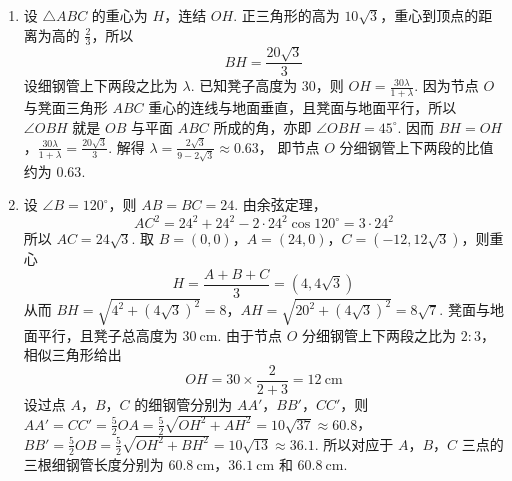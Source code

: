 \begin{solution}
\begin{enumerate}
\item 设 \(\triangle ABC\) 的重心为 \(H\)，连结 \(OH\). 正三角形的高为 \(10\sqrt3\)，重心到顶点的距离为高的 \(\frac23\)，所以
\[
BH=\frac{20\sqrt3}{3}
\]
设细钢管上下两段之比为 \(\lambda\). 已知凳子高度为 \(30\)，则
\(OH=\frac{30\lambda}{1+\lambda}\).
因为节点 \(O\) 与凳面三角形 \(ABC\) 重心的连线与地面垂直，且凳面与地面平行，所以 \(\angle OBH\) 就是 \(OB\) 与平面 \(ABC\) 所成的角，亦即 \(\angle OBH=45^\circ\). 因而
\(BH=OH\)，\(\frac{30\lambda}{1+\lambda}=\frac{20\sqrt{3}}{3}\).
解得
\(\lambda=\frac{2\sqrt{3}}{9-2\sqrt{3}}\approx 0.63\)，
即节点 \(O\) 分细钢管上下两段的比值约为 \(0.63\).
\end{enumerate}


\begin{enumerate}
\setcounter{enumi}{1}
\item 设 \(\angle B=120^\circ\)，则 \(AB=BC=24\). 由余弦定理，
\[
AC^2=24^2+24^2-2\cdot24^2\cos120^\circ=3\cdot24^2
\]
所以 \(AC=24\sqrt3\). 取 \(B=(0,0)\)，\(A=(24,0)\)，\(C=(-12,12\sqrt3)\)，则重心
\[
H=\frac{A+B+C}{3}=(4,4\sqrt3)
\]
从而
\(BH=\sqrt{4^2+(4\sqrt3)^2}=8\)，\(AH=\sqrt{20^2+(4\sqrt3)^2}=8\sqrt7\).
凳面与地面平行，且凳子总高度为 \(30\mathrm{~cm}\). 由于节点 \(O\) 分细钢管上下两段之比为 \(2:3\)，相似三角形给出
\[
OH=30\times\frac{2}{2+3}=12\mathrm{~cm}
\]
设过点 \(A\)，\(B\)，\(C\) 的细钢管分别为 \(AA'\)，\(BB'\)，\(CC'\)，则
\(AA'=CC'=\frac{5}{2}OA=\frac{5}{2}\sqrt{OH^2+AH^2}=10\sqrt{37}\approx 60.8\)，\(BB'=\frac{5}{2}OB=\frac{5}{2}\sqrt{OH^2+BH^2}=10\sqrt{13}\approx 36.1\).
所以对应于 \(A\)，\(B\)，\(C\) 三点的三根细钢管长度分别为 \(60.8 \mathrm{~cm}\)，\(36.1 \mathrm{~cm}\) 和 \(60.8 \mathrm{~cm}\).
\end{enumerate}
\end{solution}


